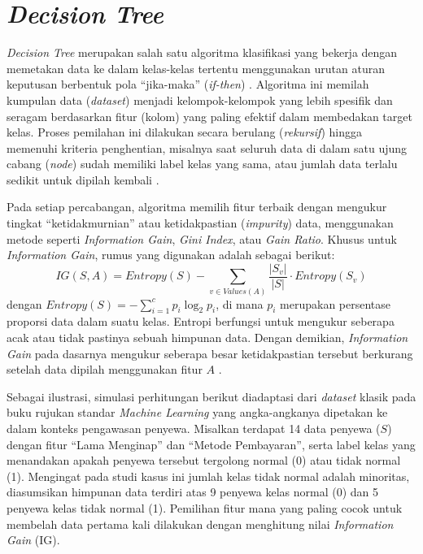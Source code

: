 \section{\it Decision Tree}\label{sec:decision_tree}

{\it Decision Tree} merupakan salah satu algoritma klasifikasi yang bekerja dengan memetakan data ke dalam kelas-kelas tertentu menggunakan urutan aturan keputusan berbentuk pola ``jika-maka'' (\textit{if-then}) \cite{tan2019introduction}. Algoritma ini memilah kumpulan data (\textit{dataset}) menjadi kelompok-kelompok yang lebih spesifik dan seragam berdasarkan fitur (kolom) yang paling efektif dalam membedakan target kelas. Proses pemilahan ini dilakukan secara berulang (\textit{rekursif}) hingga memenuhi kriteria penghentian, misalnya saat seluruh data di dalam satu ujung cabang (\textit{node}) sudah memiliki label kelas yang sama, atau jumlah data terlalu sedikit untuk dipilah kembali \cite{han2011data}.

Pada setiap percabangan, algoritma memilih fitur terbaik dengan mengukur tingkat ``ketidakmurnian'' atau ketidakpastian (\textit{impurity}) data, menggunakan metode seperti \textit{Information Gain}, \textit{Gini Index}, atau \textit{Gain Ratio}. Khusus untuk \textit{Information Gain}, rumus yang digunakan adalah sebagai berikut:
$$
IG(S, A) = Entropy(S) - \sum_{v \in Values(A)} \frac{|S_v|}{|S|} \cdot Entropy(S_v)
$$  
dengan $Entropy(S) = - \sum_{i=1}^{c} p_i \log_2 p_i$, di mana $p_i$ merupakan persentase proporsi data dalam suatu kelas. Entropi berfungsi untuk mengukur seberapa acak atau tidak pastinya sebuah himpunan data. Dengan demikian, \textit{Information Gain} pada dasarnya mengukur seberapa besar ketidakpastian tersebut berkurang setelah data dipilah menggunakan fitur $A$ \cite{quinlan1986induction}.

Sebagai ilustrasi, simulasi perhitungan berikut diadaptasi dari \textit{dataset} klasik pada buku rujukan standar \textit{Machine Learning} \cite{mitchell1997machine} yang angka-angkanya dipetakan ke dalam konteks pengawasan penyewa. Misalkan terdapat 14 data penyewa ($S$) dengan fitur ``Lama Menginap'' dan ``Metode Pembayaran'', serta label kelas yang menandakan apakah penyewa tersebut tergolong normal (0) atau tidak normal (1). Mengingat pada studi kasus ini jumlah kelas tidak normal adalah minoritas, diasumsikan himpunan data terdiri atas 9 penyewa kelas normal (0) dan 5 penyewa kelas tidak normal (1). Pemilihan fitur mana yang paling cocok untuk membelah data pertama kali dilakukan dengan menghitung nilai \textit{Information Gain} (IG).

